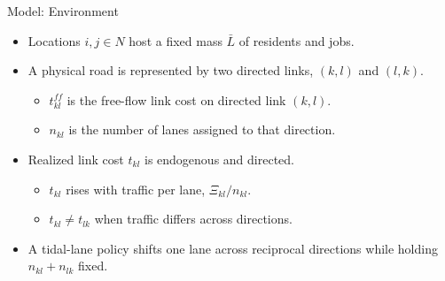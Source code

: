 \documentclass[11pt,aspectratio=169]{beamer}
\begin{document}
\begin{frame}{Model: Environment}
\begin{itemize}\small\setlength\itemsep{0.70em}
  \item Locations $i,j\in N$ host a fixed mass $\bar L$ of residents and jobs.
  \item A physical road is represented by two directed links, $(k,l)$ and $(l,k)$.
  \begin{itemize}\footnotesize\setlength\itemsep{0.30em}
    \item $t_{kl}^{ff}$ is the free-flow link cost on directed link $(k,l)$.
    \item $n_{kl}$ is the number of lanes assigned to that direction.
  \end{itemize}
  \item Realized link cost $t_{kl}$ is endogenous and directed.
  \begin{itemize}\footnotesize\setlength\itemsep{0.30em}
    \item $t_{kl}$ rises with traffic per lane, $\Xi_{kl}/n_{kl}$.
    \item $t_{kl}\neq t_{lk}$ when traffic differs across directions.
  \end{itemize}
  \item A tidal-lane policy shifts one lane across reciprocal directions while holding $n_{kl}+n_{lk}$ fixed.
\end{itemize}
\end{frame}
\end{document}
